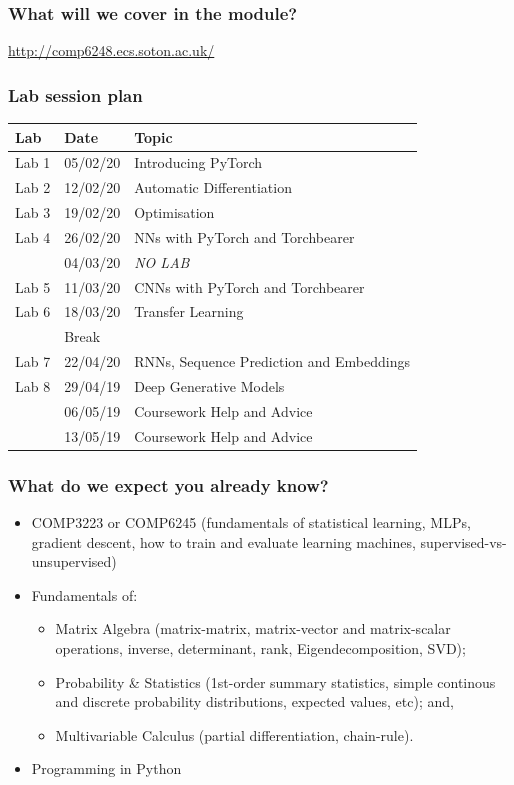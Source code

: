 \documentclass[\beamerclass]{beamer}
\begin{document}
\begin{frame}
	\frametitle{What will we cover in the module?}
	\url{http://comp6248.ecs.soton.ac.uk/}
\end{frame}

\begin{frame}
	\frametitle{Lab session plan}
	
	\begin{center}
	\begin{tabular}{ l l l }
		 Lab & Date & Topic \\ \hline
		 Lab 1  & 05/02/20 & Introducing PyTorch \\ 
		 Lab 2  & 12/02/20 & Automatic Differentiation \\  
		 Lab 3  & 19/02/20 & Optimisation \\
		 Lab 4  & 26/02/20 & NNs with PyTorch and Torchbearer \\
		 		& 04/03/20 & \emph{NO LAB} \\
 		 Lab 5  & 11/03/20 & CNNs with PyTorch and Torchbearer \\
 		 Lab 6  & 18/03/20 & Transfer Learning \\
 		 \hline
 		 & Break & \\
		 \hline
		 Lab 7  & 22/04/20 & RNNs, Sequence Prediction and Embeddings \\
		 Lab 8  & 29/04/19 & Deep Generative Models \\
		        & 06/05/19 & Coursework Help and Advice \\
 		 	    & 13/05/19 & Coursework Help and Advice \\
	\end{tabular}
	\end{center}
\end{frame}

\begin{frame}
	\frametitle{What do we expect you already know?}
	
	\begin{itemize}
	\item<+-> COMP3223 or COMP6245 (fundamentals of statistical learning, MLPs, gradient descent, how to train and evaluate learning machines, supervised-vs-unsupervised)
	\item<+-> Fundamentals of:
	\begin{itemize}
		\item Matrix Algebra (matrix-matrix, matrix-vector and matrix-scalar operations, inverse, determinant, rank, Eigendecomposition, SVD);
		\item Probability \& Statistics (1st-order summary statistics, simple continous and discrete probability distributions, expected values, etc); and, 
		\item Multivariable Calculus (partial differentiation, chain-rule).
	\end{itemize}
	\item<+-> Programming in Python
	\end{itemize}
\end{frame}
\end{document}

